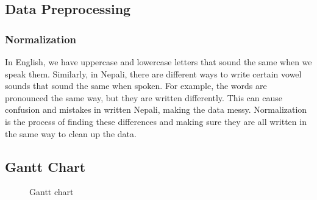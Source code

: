        \subsection{Data Preprocessing}
       \subsubsection{Normalization}
       In English, we have uppercase and lowercase letters that sound the same when we speak them. Similarly, in Nepali, there are different ways to write certain vowel sounds that sound the same when spoken. For example, the words 
        are pronounced the same way, but they are written differently. This can cause confusion and mistakes in written Nepali, making the data messy. Normalization is the process of finding these differences and making sure they are all written in the same way to clean up the data.


       
        \newpage
        \justifying
        \subsection{Gantt Chart}
            \begin{figure}[hbt!]
                \caption{Gantt chart}
            \end{figure}

